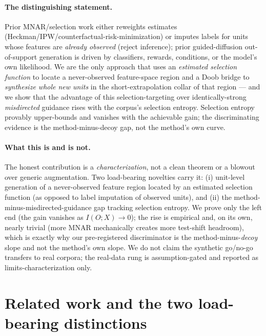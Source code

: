 \documentclass[10pt]{article}
\newcommand{\IOX}{I(O;X)}
\begin{document}
\paragraph{The distinguishing statement.}
Prior MNAR/selection work either reweights estimates
(Heckman/IPW/counterfactual-risk-minimization) or imputes labels for units whose
features are \emph{already observed} (reject inference); prior guided-diffusion
out-of-support generation is driven by classifiers, rewards, conditions, or the
model's own likelihood. We are the only approach that uses an \emph{estimated
selection function} to locate a never-observed feature-space region and a Doob
bridge to \emph{synthesize whole new units} in the short-extrapolation collar of
that region --- and we show that the advantage of this selection-targeting over
identically-strong \emph{misdirected} guidance rises with the corpus's selection
entropy. Selection entropy provably upper-bounds and vanishes with the
achievable gain; the discriminating evidence is the method-minus-decoy gap, not
the method's own curve.

\paragraph{What this is and is not.} The honest contribution is a
\emph{characterization}, not a clean theorem or a blowout over generic
augmentation. Two load-bearing novelties carry it: (i) unit-level generation of
a never-observed feature region located by an estimated selection function (as
opposed to label imputation of observed units), and (ii) the
method-minus-misdirected-guidance gap tracking selection entropy. We prove only
the left end (the gain vanishes as $\IOX\!\to\!0$); the rise is empirical and,
on its own, nearly trivial (more MNAR mechanically creates more test-shift
headroom), which is exactly why our pre-registered discriminator is the
method-minus-\emph{decoy} slope and not the method's own slope. We do not claim
the synthetic go/no-go transfers to real corpora; the real-data rung is
assumption-gated and reported as limits-characterization only.



\section{Related work and the two load-bearing distinctions}
\label{sec:related}
\end{document}
